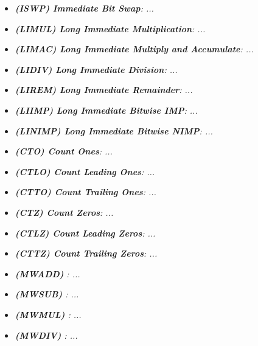 \begin{multicols}{2}
\begin{itemize}
                \item \textit{\textbf{(ISWP) Immediate Bit Swap}: ...}

                \item \textit{\textbf{(LIMUL) Long Immediate Multiplication}: ...}

                \item \textit{\textbf{(LIMAC) Long Immediate Multiply and Accumulate}: ...}
                
                \item \textit{\textbf{(LIDIV) Long Immediate Division}: ...}

                \item \textit{\textbf{(LIREM) Long Immediate Remainder}: ...}

                \item \textit{\textbf{(LIIMP) Long Immediate Bitwise IMP}: ...}

                \item \textit{\textbf{(LINIMP) Long Immediate Bitwise NIMP}: ...}
                
                \item \textit{\textbf{(CTO) Count Ones}: ...}

                \item \textit{\textbf{(CTLO) Count Leading Ones}: ...}

                \item \textit{\textbf{(CTTO) Count Trailing Ones}: ...}

                \item \textit{\textbf{(CTZ) Count Zeros}: ...}
                
                \item \textit{\textbf{(CTLZ) Count Leading Zeros}: ...}

                \item \textit{\textbf{(CTTZ) Count Trailing Zeros}: ...}

                \item \textit{\textbf{(MWADD) }: ...}

                \item \textit{\textbf{(MWSUB) }: ...}
                
                \item \textit{\textbf{(MWMUL) }: ...}

                \item \textit{\textbf{(MWDIV) }: ...}


\end{itemize}
\end{multicols}
